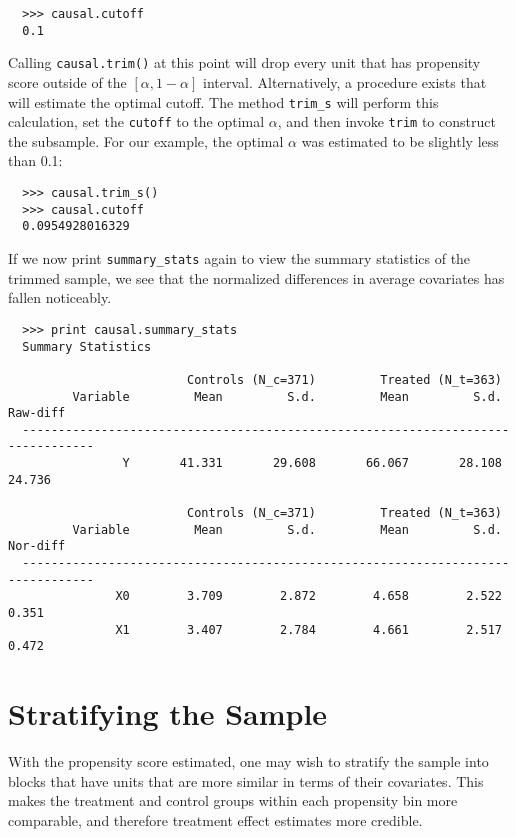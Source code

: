 \documentclass[12pt]{article}
\theoremstyle{definition}
\theoremstyle{definition}
\theoremstyle{definition}
\theoremstyle{remark}
\begin{document}
\begin{verbatim}
  >>> causal.cutoff
  0.1
\end{verbatim}

Calling \texttt{causal.trim()} at this point will drop every unit that has propensity score outside of the $[\alpha, 1-\alpha]$ interval. Alternatively, a procedure exists that will estimate the optimal cutoff. The method \texttt{trim\_s} will perform this calculation, set the \texttt{cutoff} to the optimal $\alpha$, and then invoke \texttt{trim} to construct the subsample. For our example, the optimal $\alpha$ was estimated to be slightly less than 0.1:
\begin{verbatim}
  >>> causal.trim_s()
  >>> causal.cutoff
  0.0954928016329
\end{verbatim}

If we now print \texttt{summary\_stats} again to view the summary statistics of the trimmed sample, we see that the normalized differences in average covariates has fallen noticeably.
\begin{verbatim}
  >>> print causal.summary_stats
  Summary Statistics
  
                         Controls (N_c=371)         Treated (N_t=363)             
         Variable         Mean         S.d.         Mean         S.d.     Raw-diff
  --------------------------------------------------------------------------------
                Y       41.331       29.608       66.067       28.108       24.736
  
                         Controls (N_c=371)         Treated (N_t=363)             
         Variable         Mean         S.d.         Mean         S.d.     Nor-diff
  --------------------------------------------------------------------------------
               X0        3.709        2.872        4.658        2.522        0.351
               X1        3.407        2.784        4.661        2.517        0.472
\end{verbatim}

\section*{Stratifying the Sample}

With the propensity score estimated, one may wish to stratify the sample into blocks that have units that are more similar in terms of their covariates. This makes the treatment and control groups within each propensity bin more comparable, and therefore treatment effect estimates more credible.
\end{document}
